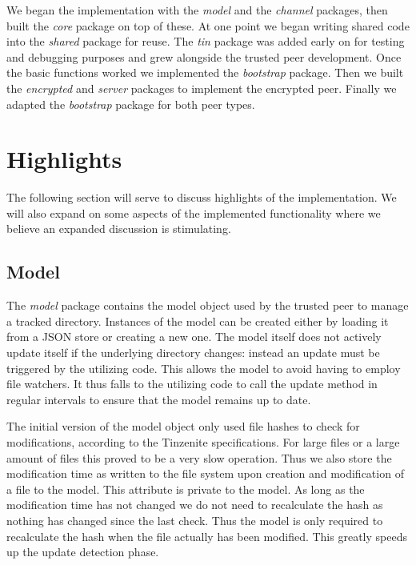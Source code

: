 We began the implementation with the \emph{model} and the \emph{channel} packages, then built the \emph{core} package on top of these.
At one point we began writing shared code into the \emph{shared} package for reuse.
The \emph{tin} package was added early on for testing and debugging purposes and grew alongside the trusted peer development.
Once the basic functions worked we implemented the \emph{bootstrap} package.
Then we built the \emph{encrypted} and \emph{server} packages to implement the encrypted peer.
Finally we adapted the \emph{bootstrap} package for both peer types.

\section{Highlights}
\label{sec:Highlights}

The following section will serve to discuss highlights of the implementation.
We will also expand on some aspects of the implemented functionality where we believe an expanded discussion is stimulating.

\subsection{Model}
\label{sub:Model}

The \emph{model} package contains the model object used by the trusted peer to manage a tracked directory.
Instances of the model can be created either by loading it from a JSON store or creating a new one.
The model itself does not actively update itself if the underlying directory changes: instead an update must be triggered by the utilizing code.
This allows the model to avoid having to employ file watchers.
It thus falls to the utilizing code to call the update method in regular intervals to ensure that the model remains up to date.

The initial version of the model object only used file hashes to check for modifications, according to the Tinzenite specifications.
For large files or a large amount of files this proved to be a very slow operation.
Thus we also store the modification time as written to the file system upon creation and modification of a file to the model.
This attribute is private to the model.
As long as the modification time has not changed we do not need to recalculate the hash as nothing has changed since the last check.
Thus the model is only required to recalculate the hash when the file actually has been modified.
This greatly speeds up the update detection phase.

